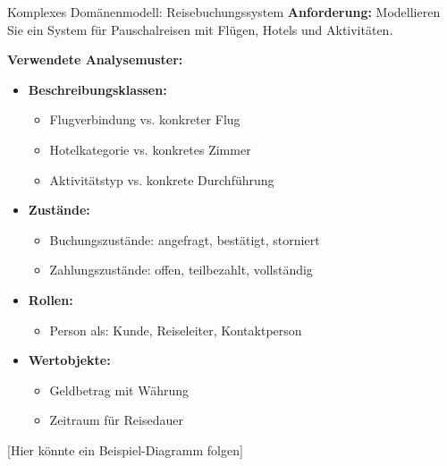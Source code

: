 \begin{example2}{Komplexes Domänenmodell: Reisebuchungssystem}
\textbf{Anforderung:} Modellieren Sie ein System für Pauschalreisen mit Flügen, Hotels und Aktivitäten.

\textbf{Verwendete Analysemuster:}
\begin{itemize}
    \item \textbf{Beschreibungsklassen:}
    \begin{itemize}
        \item Flugverbindung vs. konkreter Flug
        \item Hotelkategorie vs. konkretes Zimmer
        \item Aktivitätstyp vs. konkrete Durchführung
    \end{itemize}
    
    \item \textbf{Zustände:}
    \begin{itemize}
        \item Buchungszustände: angefragt, bestätigt, storniert
        \item Zahlungszustände: offen, teilbezahlt, vollständig
    \end{itemize}
    
    \item \textbf{Rollen:}
    \begin{itemize}
        \item Person als: Kunde, Reiseleiter, Kontaktperson
    \end{itemize}
    
    \item \textbf{Wertobjekte:}
    \begin{itemize}
        \item Geldbetrag mit Währung
        \item Zeitraum für Reisedauer
    \end{itemize}
\end{itemize}
[Hier könnte ein Beispiel-Diagramm folgen]
\end{example2}

